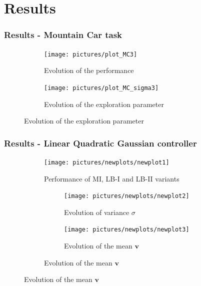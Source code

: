 \documentclass{beamer}
\newcommand{\vv}{\boldsymbol{v}}
\begin{document}
\section{Results}
\begin{frame}
\frametitle{Results - Mountain Car task}
\centering
\begin{figure}
\begin{subfigure}[t]{0.49\textwidth}
\texttt{[image: pictures/plot\_MC3]}
\caption{Evolution of the performance}
\end{subfigure}
\begin{subfigure}[t]{0.49\textwidth}
\texttt{[image: pictures/plot\_MC\_sigma3]}
\caption{Evolution of the exploration parameter}
\end{subfigure}
\end{figure}
\end{frame}

%
%

\begin{frame}
\frametitle{Results - Linear Quadratic Gaussian controller}

\vspace{-0.6cm}
\begin{figure}[p]
\begin{subfigure}[p]{0.54\textwidth}
\texttt{[image: pictures/newplots/newplot1]}
\caption{Performance of MI, LB-I and LB-II variants}
\end{subfigure}
\hfill
\begin{subfigure}[p]{0.45\textwidth}
\begin{subfigure}[t]{\textwidth}
\centering
\texttt{[image: pictures/newplots/newplot2]}
\caption{Evolution of variance $\sigma$}
\end{subfigure}
\vfill
\begin{subfigure}[b]{\textwidth}
\centering
\texttt{[image: pictures/newplots/newplot3]}
\caption{Evolution of the mean $\vv$}
\end{subfigure}
\end{subfigure}

\end{figure}
\end{frame}
\end{document}
